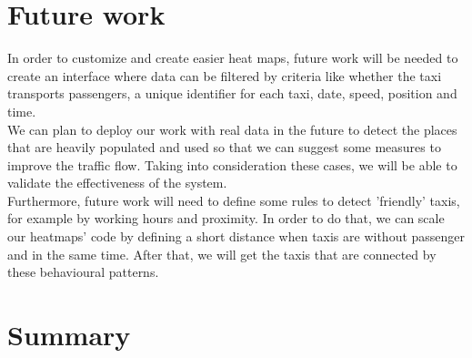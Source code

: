 \documentclass[11pt,conference,a4paper,twocolumns,romanappendices]{IEEEtran}
\begin{document}
\section{Future work}

In order to customize and create easier heat maps, future work will be needed to create an interface where data can be filtered by criteria like whether the taxi transports passengers, a unique identifier for each taxi, date, speed, position and time.  \\
We can plan to deploy our work with real data in the future to detect the places that are heavily populated and used so that we can suggest some measures to improve the traffic flow. Taking into consideration these cases, we will be able to validate the effectiveness of the system. \\
Furthermore, future work will need to define some rules to detect 'friendly' taxis, for example by working hours and proximity. In order to do that, we can scale our heatmaps' code by defining a short distance when taxis are without passenger and in the same time. After that, we will get the taxis that are connected by these behavioural patterns.

\section{Summary}
\end{document}
